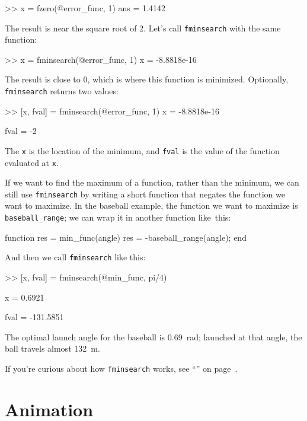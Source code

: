 \begin{code}
>> x = fzero(@error_func, 1)
ans = 1.4142
\end{code}

The result is near the square root of 2.  Let's call \lstinline{fminsearch} with the same function:

\begin{code}
>> x = fminsearch(@error_func, 1)
x = -8.8818e-16
\end{code}

The result is close to 0, which is where this function is minimized.  Optionally, \lstinline{fminsearch} returns two values:

\begin{code}
>> [x, fval] = fminsearch(@error_func, 1)
x = -8.8818e-16

fval = -2
\end{code}

The \lstinline{x} is the location of the minimum, and \lstinline{fval} is the value of the function evaluated at \lstinline{x}.

If we want to find the maximum of a function, rather than the minimum, we can still use \lstinline{fminsearch} by writing a short function that negates the function we want to maximize.
In the baseball example, the function we want to maximize is \lstinline{baseball_range}; we can wrap it in another function like~this:

\begin{code}
function res = min_func(angle)
    res = -baseball_range(angle);
end
\end{code}

And then we call \lstinline{fminsearch} like this:

\begin{code}
>> [x, fval] = fminsearch(@min_func, pi/4)

x = 0.6921

fval = -131.5851
\end{code}

The optimal launch angle for the baseball is \SI{0.69}{\radian}; launched at that angle, the ball travels almost \SI{132}{\meter}.

If you're curious about how \lstinline{fminsearch} works, see ``'' on page~\pageref{howfminsearch}.


\section{Animation}

